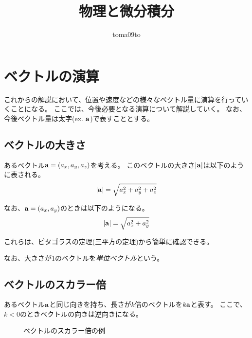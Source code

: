 \documentclass{ltjsreport}
\title{物理と微分積分}
\author{toma09to}
\begin{document}
\maketitle

%

\chapter{ベクトルの演算}

これからの解説において、位置や速度などの様々なベクトル量に演算を行っていくことになる。
ここでは、今後必要となる演算について解説していく。
なお、今後ベクトル量は太字(ex. $\vb{a}$)で表すこととする。

\section{ベクトルの大きさ}

あるベクトル$\vb{a}=(a_x, a_y, a_z)$を考える。
このベクトルの大きさ$|\vb{a}|$は以下のように表される。
\begin{equation}
    |\vb{a}| = \sqrt{a_x^2+a_y^2+a_z^2}
\end{equation}

なお、$\vb{a}=(a_x, a_y)$のときは以下のようになる。
\begin{equation}
    |\vb{a}| = \sqrt{a_x^2+a_y^2}
\end{equation}

これらは、ピタゴラスの定理(三平方の定理)から簡単に確認できる。

なお、大きさが1のベクトルを\emph{単位ベクトル}という。

\section{ベクトルのスカラー倍}

あるベクトル$\vb{a}$と同じ向きを持ち、長さが$k$倍のベクトルを$k\vb{a}$と表す。
ここで、$k < 0$のときベクトルの向きは逆向きになる。
\begin{figure}[H]
    \centering
    \caption{ベクトルのスカラー倍の例}
    \label{ベクトルのスカラー倍の例}
\end{figure}
\end{document}
